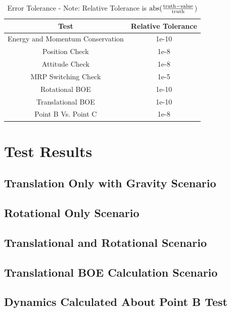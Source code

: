 \begin{table}[htbp]
	\caption{Error Tolerance - Note: Relative Tolerance is $\textnormal{abs}(\frac{\textnormal{truth} - \textnormal{value}}{\textnormal{truth}}$)}
	\label{tab:errortol}
	\centering \fontsize{10}{10}\selectfont
	\begin{tabular}{ c | c } %
		\hline
		\textbf{Test}   & \textbf{Relative Tolerance} \\
		\hline
		Energy and Momentum Conservation & 1e-10 \\
		Position Check & 1e-8 \\
		Attitude Check & 1e-8 \\
		MRP Switching Check & 1e-5 \\
		Rotational BOE & 1e-10 \\
		Translational BOE & 1e-10 \\
		Point B Vs. Point C & 1e-8 \\
		\hline	
	\end{tabular}
\end{table}

\clearpage

\section{Test Results}

\subsection{Translation Only with Gravity Scenario}


\clearpage

\subsection{Rotational Only Scenario}





\clearpage

\subsection{Translational and Rotational Scenario}




\clearpage

\subsection{Translational BOE Calculation Scenario}


\clearpage

\subsection{Dynamics Calculated About Point B Test}


\clearpage